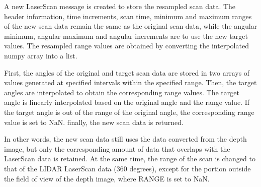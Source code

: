 A new LaserScan message is created to store the resampled scan data. The header information, time increments, scan time, minimum and maximum ranges of the new scan data remain the same as the original scan data, while the angular minimum, angular maximum and angular increments are to use the new target values. The resampled range values are obtained by converting the interpolated numpy array into a list.

First, the angles of the original and target scan data are stored in two arrays of values generated at specified intervals within the specified range. Then, the target angles are interpolated to obtain the corresponding range values. The target angle is linearly interpolated based on the original angle and the range value. If the target angle is out of the range of the original angle, the corresponding range value is set to NaN. finally, the new scan data is returned.

In other words, the new scan data still uses the data converted from the depth image, but only the corresponding amount of data that overlaps with the LaserScan data is retained. At the same time, the range of the scan is changed to that of the LIDAR LaserScan data (360 degrees), except for the portion outside the field of view of the depth image, where RANGE is set to NaN.

